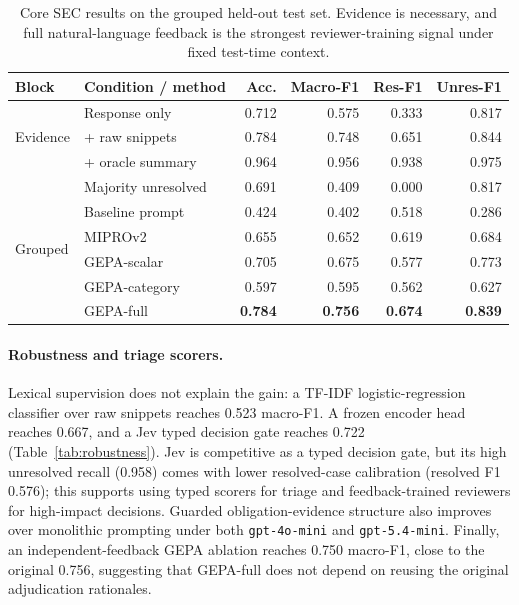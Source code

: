 \documentclass[11pt]{article}
\begin{document}
\begin{table}[t]
\centering
\scriptsize
\setlength{\tabcolsep}{4pt}
\begin{tabular}{llrrrr}
\toprule
\textbf{Block} & \textbf{Condition / method} & \textbf{Acc.} & \textbf{Macro-F1} & \textbf{Res-F1} & \textbf{Unres-F1} \\
\midrule
\multirow{3}{*}{Evidence}
& Response only & 0.712 & 0.575 & 0.333 & 0.817 \\
& + raw snippets & 0.784 & 0.748 & 0.651 & 0.844 \\
& + oracle summary & 0.964 & 0.956 & 0.938 & 0.975 \\
\midrule
\multirow{6}{*}{Grouped}
& Majority unresolved & 0.691 & 0.409 & 0.000 & 0.817 \\
& Baseline prompt & 0.424 & 0.402 & 0.518 & 0.286 \\
& MIPROv2 & 0.655 & 0.652 & 0.619 & 0.684 \\
& GEPA-scalar & 0.705 & 0.675 & 0.577 & 0.773 \\
& GEPA-category & 0.597 & 0.595 & 0.562 & 0.627 \\
& GEPA-full & \textbf{0.784} & \textbf{0.756} & \textbf{0.674} & \textbf{0.839} \\
\bottomrule
\end{tabular}
\caption{Core SEC results on the grouped held-out test set. Evidence is necessary, and full natural-language feedback is the strongest reviewer-training signal under fixed test-time context.}
\label{tab:main_results}
\end{table}

\paragraph{Robustness and triage scorers.}
Lexical supervision does not explain the gain: a TF-IDF logistic-regression classifier over raw snippets reaches 0.523 macro-F1. A frozen encoder head reaches 0.667, and a Jev typed decision gate reaches 0.722 (Table~\ref{tab:robustness}). Jev is competitive as a typed decision gate, but its high unresolved recall (0.958) comes with lower resolved-case calibration (resolved F1 0.576); this supports using typed scorers for triage and feedback-trained reviewers for high-impact decisions. Guarded obligation-evidence structure also improves over monolithic prompting under both \texttt{gpt-4o-mini} and \texttt{gpt-5.4-mini}. Finally, an independent-feedback GEPA ablation reaches 0.750 macro-F1, close to the original 0.756, suggesting that GEPA-full does not depend on reusing the original adjudication rationales.
\end{document}
